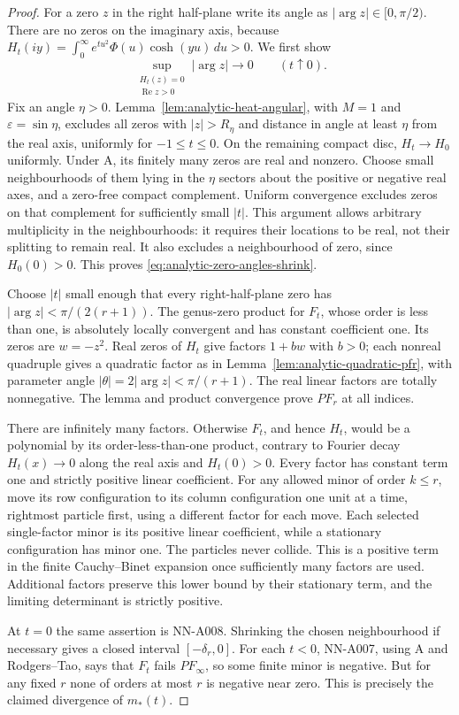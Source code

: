 \begin{proof}
For a zero $z$ in the right half-plane write its angle as
$|\arg z|\in[0,\pi/2)$. There are no zeros on the imaginary axis,
because $H_t(iy)=\int_0^\infty e^{tu^2}\Phi(u)\cosh(yu)\,du>0$.
We first show
\begin{equation}\label{eq:analytic-zero-angles-shrink}
 \sup_{\substack{H_t(z)=0\\\operatorname{Re}z>0}}|\arg z|
                         \longrightarrow0\qquad(t\uparrow0).
\end{equation}
Fix an angle $\eta>0$. Lemma~\ref{lem:analytic-heat-angular}, with
$M=1$ and $\varepsilon=\sin\eta$, excludes all zeros with
$|z|>R_\eta$ and distance in angle at least $\eta$ from the real
axis, uniformly for $-1\le t\le0$. On the remaining compact disc,
$H_t\to H_0$ uniformly. Under A, its finitely many zeros are real
and nonzero. Choose small neighbourhoods of them lying in the
$\eta$ sectors about the positive or negative real axes, and a
zero-free compact complement. Uniform convergence excludes zeros
on that complement for sufficiently small $|t|$. This argument
allows arbitrary multiplicity in the neighbourhoods: it requires
their locations to be real, not their splitting to remain real.
It also excludes a neighbourhood of zero, since $H_0(0)>0$.
This proves \eqref{eq:analytic-zero-angles-shrink}.

Choose $|t|$ small enough that every right-half-plane zero has
$|\arg z|<\pi/(2(r+1))$. The genus-zero product for $F_t$, whose
order is less than one, is absolutely locally convergent and has
constant coefficient one. Its zeros are $w=-z^2$. Real zeros of
$H_t$ give factors $1+bw$ with $b>0$; each nonreal quadruple gives
a quadratic factor as in Lemma~\ref{lem:analytic-quadratic-pfr},
with parameter angle $|\theta|=2|\arg z|<\pi/(r+1)$.
The real linear factors are totally nonnegative. The lemma and
product convergence prove $PF_r$ at all indices.

There are infinitely many factors. Otherwise $F_t$, and hence
$H_t$, would be a polynomial by its order-less-than-one product,
contrary to Fourier decay $H_t(x)\to0$ along the real axis and
$H_t(0)>0$. Every factor has constant term one and strictly
positive linear coefficient. For any allowed minor of order
$k\le r$, move its row configuration to its column configuration
one unit at a time, rightmost particle first, using a different
factor for each move. Each selected single-factor minor is its
positive linear coefficient, while a stationary configuration
has minor one. The particles never collide. This is a positive
term in the finite Cauchy--Binet expansion once sufficiently many
factors are used. Additional factors preserve this lower bound
by their stationary term, and the limiting determinant is
strictly positive.

At $t=0$ the same assertion is NN-A008. Shrinking the chosen
neighbourhood if necessary gives a closed interval
$[-\delta_r,0]$. For each $t<0$, NN-A007, using A and
Rodgers--Tao, says that $F_t$ fails $PF_\infty$, so some finite
minor is negative. But for any fixed $r$ none of orders at most
$r$ is negative near zero. This is precisely the claimed
divergence of $m_*(t)$.
\end{proof}

